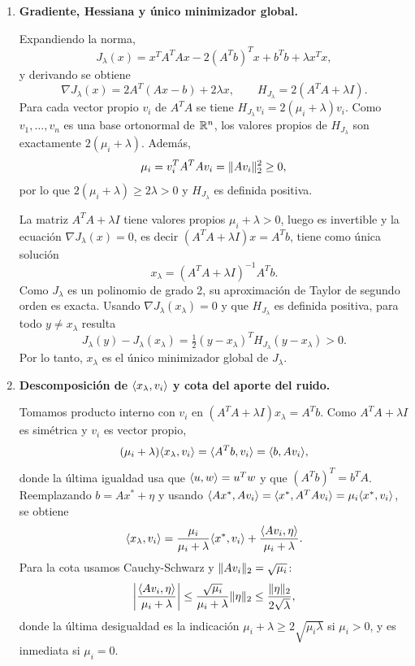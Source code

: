 \documentclass{article}
\begin{document}
\begin{enumerate}[label=\roman*., widest=iv]
  \item \textbf{Gradiente, Hessiana y único minimizador global.}

  Expandiendo la norma,
  \[
    J_\lambda(x) = x^T A^T A x - 2 (A^T b)^T x + b^T b + \lambda x^T x,
  \]
  y derivando se obtiene
  \[
    \nabla J_\lambda(x) = 2A^T(Ax - b) + 2\lambda x, \qquad H_{J_\lambda} = 2(A^T A + \lambda I).
  \]
  Para cada vector propio $v_i$ de $A^T A$ se tiene $H_{J_\lambda} v_i = 2(\mu_i + \lambda) v_i$. Como $v_1, \dots, v_n$ es una base ortonormal de $\R^n$, los valores propios de $H_{J_\lambda}$ son exactamente $2(\mu_i + \lambda)$. Además,
  \[
    \mu_i = v_i^T A^T A v_i = \norm{Av_i}_2^2 \geq 0,
  \]
  por lo que $2(\mu_i + \lambda) \geq 2\lambda > 0$ y $H_{J_\lambda}$ es definida positiva.

  La matriz $A^T A + \lambda I$ tiene valores propios $\mu_i + \lambda > 0$, luego es invertible y la ecuación $\nabla J_\lambda(x) = 0$, es decir $(A^T A + \lambda I)x = A^T b$, tiene como única solución
  \[
    x_\lambda = (A^T A + \lambda I)^{-1} A^T b.
  \]
  Como $J_\lambda$ es un polinomio de grado 2, su aproximación de Taylor de segundo orden es exacta. Usando $\nabla J_\lambda(x_\lambda) = 0$ y que $H_{J_\lambda}$ es definida positiva, para todo $y \neq x_\lambda$ resulta
  \[
    J_\lambda(y) - J_\lambda(x_\lambda) = \tfrac{1}{2}(y - x_\lambda)^T H_{J_\lambda} (y - x_\lambda) > 0.
  \]
  Por lo tanto, $x_\lambda$ es el único minimizador global de $J_\lambda$.

  \item \textbf{Descomposición de $\ip{x_\lambda}{v_i}$ y cota del aporte del ruido.}

  Tomamos producto interno con $v_i$ en $(A^T A + \lambda I) x_\lambda = A^T b$. Como $A^T A + \lambda I$ es simétrica y $v_i$ es vector propio,
  \[
    (\mu_i + \lambda)\ip{x_\lambda}{v_i} = \ip{A^T b}{v_i} = \ip{b}{Av_i},
  \]
  donde la última igualdad usa que $\ip{u}{w} = u^T w$ y que $(A^T b)^T = b^T A$. Reemplazando $b = Ax^* + \eta$ y usando $\ip{Ax^*}{Av_i} = \ip{x^*}{A^T A v_i} = \mu_i \ip{x^*}{v_i}$, se obtiene
  \[
    \ip{x_\lambda}{v_i} = \frac{\mu_i}{\mu_i + \lambda}\ip{x^*}{v_i} + \frac{\ip{Av_i}{\eta}}{\mu_i + \lambda}.
  \]
  Para la cota usamos Cauchy-Schwarz y $\norm{Av_i}_2 = \sqrt{\mu_i}$:
  \[
    \abs*{\frac{\ip{Av_i}{\eta}}{\mu_i + \lambda}} \leq \frac{\sqrt{\mu_i}}{\mu_i + \lambda}\norm{\eta}_2 \leq \frac{\norm{\eta}_2}{2\sqrt{\lambda}},
  \]
  donde la última desigualdad es la indicación $\mu_i + \lambda \geq 2\sqrt{\mu_i \lambda}$ si $\mu_i > 0$, y es inmediata si $\mu_i = 0$.


\end{enumerate}
\end{document}
